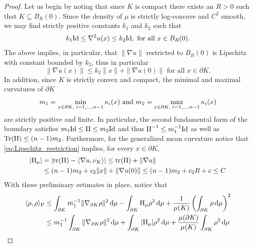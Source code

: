 \documentclass[a4paper, 11pt]{article}
\newcommand{\tra}{\mathrm{tr}}
\theoremstyle{definition}
\newcommand{\di}{\, \mathrm{d}}
\begin{document}
\begin{proof} Let us begin by noting that since $K$ is compact there exists an $R>0$ such that $K \subseteq B_{R}(0)$. Since the density of $\mu$ is strictly log-concave and $C^2$ smooth, we may find strictly positive constants $k_{1}$ and $k_{2}$ such that 
\begin{equation}\label{eq:restricted_Hessian_pinching} \notag
k_{1}\mathrm{Id} \leq \nabla^2u(x) \leq k_{2}\mathrm{Id}, \,\, \text{for all} \,\, x \in B_{R}(0).
\end{equation}
The above implies, in particular, that $\|\nabla u\|$ restricted to $B_{R}(0)$ is Lipschitz with constant bounded by $k_{2}$, thus in particular
\begin{equation}\label{eq:Lipschitz_restriction}
\|\nabla u(x)\| \leq k_{2}\|x\|+\|\nabla u(0)\| \,\, \text{for all} \,\, x \in \partial K.
\end{equation}
In addition, since $K$ is strictly convex and compact, the minimal and maximal curvatures of $\partial K$
\begin{equation}\label{eq:min_max_curvature} \notag
m_{1} = \min_{x \in \partial K, \,\,i=1,\dots,n-1} \kappa_{i}(x) \,\, \text{and} \,\, m_{2} = \max_{x \in \partial K, \,\,i=1,\dots,n-1} \kappa_{i}(x)
\end{equation}
are strictly positive and finite. In particular, the second fundamental form of the boundary satisfies $ m_{1} \mathrm{Id} \leq {\rm{II}} \leq m_{2}\mathrm{Id}$ and thus ${\rm{II}}^{-1} \leq m^{-1}_{1}\mathrm{Id} $ as well as $\mathrm{Tr}({\rm{II}}) \leq (n-1)m_{2}$. Furthermore, for the generalized mean curvature notice that \eqref{eq:Lipschitz_restriction} implies, for every $x \in \partial K$,
\begin{align} \notag 
    |{\rm H}_{\mu}| &= |\tra({\rm{II}}) - \langle \nabla u, \nu_{K}\rangle | \leq \tra({\rm{II}})+ \|\nabla u \| \\
    &\leq (n-1)m_{2}+c_{2}\|x\|+ \|\nabla u(0)\| \leq (n-1)m_{2}+c_{2}R +c \leq C  \label{eq:Generalised_Mean_Estimate}
\end{align}
With these preliminary estimates in place, notice that
\begin{align*}
    \langle \rho , \rho \rangle_{\rm P} &\leq \int_{\partial K} m^{-1}_{1}\|\nabla_{\partial K}\rho\|^2\di \mu-\int_{\partial K}{\rm H}_{\mu}\rho^2\di \mu+\frac{1}{\mu(K)}\left(\int_{\partial K} \rho \di \mu\right)^2 \\
    &\leq m^{-1}_{1}\int_{\partial K}\|\nabla_{\partial K}\rho\|^2\di \mu + \int_{\partial K} |{\rm H}_{\mu}|\rho^2\di \mu +\frac{\mu(\partial K)}{\mu(K)}\int_{\partial K} \rho^2 \di \mu \\

\end{align*}
\end{proof}
\end{document}
